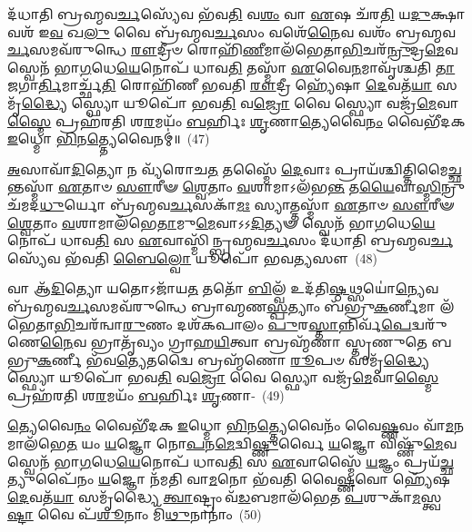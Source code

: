 𑌦᳴𑌧𑌾𑌤𑌿 𑌬𑍍𑌰𑌹𑍍𑌮𑌵\-\ul{𑌰𑍍𑌚}\-𑌸𑍍𑌯𑍇᳴𑌵 𑌭᳴𑌵\-\ul{𑌤𑌿} 𑌵\-\ul{𑌶𑌂} 𑌵𑌾 \ul{𑌏}\-𑌷 𑌚᳴𑌰\-\ul{𑌤𑌿} 𑌯\-\ul{𑌦𑍁}\-𑌕𑍍𑌷𑌾 𑌵𑌶᳴ 𑌇\-\ul{𑌵} 𑌖\-\ul{𑌲𑍁} 𑌵𑍈 𑌬𑍍𑌰᳴𑌹𑍍𑌮𑌵\-\ul{𑌰𑍍𑌚}\-𑌸𑌂 𑌵𑌶𑍇᳴\-\ul{𑌨𑍈}\-𑌵 𑌵𑌶𑌂᳴ 𑌬𑍍𑌰𑌹𑍍𑌮𑌵\-\ul{𑌰𑍍𑌚}\-𑌸𑌮𑌵᳴\-𑌰𑍁𑌨𑍍𑌧𑍇 \ul{𑌰𑍗}\-𑌦𑍍𑌰𑍀𑍞 𑌰𑍋𑌹𑌿᳴\-\ul{𑌣𑍀}\-𑌮𑌾𑌲᳴𑌭𑍇𑌤𑌾\-\ul{𑌭𑌿}\-𑌚𑌰᳴\-\ul{𑌨𑍍𑌰𑍁}\-𑌦𑍍𑌰\-\ul{𑌮𑍇}\-𑌵 𑌸𑍍𑌵𑍇𑌨᳴ 𑌭𑌾\-\ul{𑌗}\-𑌧𑍇\-\ul{𑌯𑍇}\-𑌨𑍋𑌪᳴ 𑌧𑌾𑌵\-\ul{𑌤𑌿} 𑌤𑌸𑍍𑌮𑌾᳴ \ul{𑌏}\-𑌵𑍈\-\ul{𑌨}\-𑌮𑌾𑌵𑍃᳴𑌶𑍍𑌚𑌤𑌿 \ul{𑌤𑌾}\-𑌜𑌗𑌾\-\ul{𑌰𑍍𑌤𑌿}\-𑌮𑌾𑌰𑍍𑌚𑍍𑌛᳴\-\ul{𑌤𑌿} 𑌰𑍋𑌹𑌿᳴𑌣𑍀 𑌭𑌵𑌤𑌿 \ul{𑌰𑍗}\-𑌦𑍍𑌰𑍀 𑌹𑍍𑌯𑍇᳴𑌷𑌾 \ul{𑌦𑍇}\-𑌵𑌤᳴\-\ul{𑌯𑌾} 𑌸𑌮𑍃᳴\-\ul{𑌦𑍍𑌧𑍍𑌯𑍈} 𑌸𑍍𑌫𑍍𑌯𑍋 𑌯𑍂𑌪𑍋᳴ 𑌭𑌵\-\ul{𑌤𑌿} 𑌵\-\ul{𑌜𑍍𑌰𑍋} 𑌵𑍈 𑌸𑍍𑌫𑍍𑌯𑍋 𑌵𑌜𑍍𑌰᳴\-\ul{𑌮𑍇}\-𑌵𑌾\-\ul{𑌸𑍍𑌮𑍈} 𑌪𑍍𑌰𑌹᳴𑌰𑌤𑌿 𑌶\-\ul{𑌰}\-𑌮𑌯𑌂᳴ \ul{𑌬}\-𑌰𑍍\mbox{}𑌹𑌿𑌃 \ul{𑌶𑍃}\-𑌣𑌾\-\ul{𑌤𑍍𑌯𑍇}\-𑌵𑍈\-\ul{𑌨𑌂} 𑌵𑍈𑌭𑍀᳴𑌦𑌕 \ul{𑌇}\-𑌧𑍍𑌮𑍋 \ul{𑌭𑌿}\-𑌨\-\ul{𑌤𑍍𑌤𑍍𑌯𑍇}\-𑌵𑍈𑌨𑌮𑍍॑॥~(47)

{\anuvakamend[{\-\ul{𑌅}\-𑌭𑌿 𑌖\-\ul{𑌲𑍁} 𑌵𑍃\-\ul{𑌷𑍍𑌟𑌿}\-𑌶𑍍𑌛𑌨𑍍𑌦᳴𑌸𑌾\-\ul{𑌮𑍇}\-𑌵 𑌰𑌸𑍇᳴𑌨 \ul{𑌪𑍍𑌰}\-𑌜𑌾𑌮𑌵᳴ 𑌵𑍈𑌶𑍍𑌵\-\ul{𑌦𑍇}\-𑌵𑌾 𑌵𑍈 𑌬𑍍𑌰᳴𑌹𑍍𑌮𑌵\-\ul{𑌰𑍍𑌚}\-𑌸𑌂 𑌯𑍂\-\ul{𑌪} 𑌏\-\ul{𑌕𑌾}\-𑌨𑍍𑌨𑌵𑌿𑍞᳴\-\ul{𑌶}\-𑌤𑌿𑌶𑍍𑌚᳴।~(7)।}]}

\-\ul{𑌅}\-𑌸𑌾𑌵𑌾᳴\-\ul{𑌦𑌿}\-𑌤𑍍𑌯𑍋 𑌨 𑌵𑍍𑌯᳴𑌰𑍋𑌚\-\ul{𑌤} 𑌤𑌸𑍍𑌮𑍈᳴ \ul{𑌦𑍇}\-𑌵𑌾𑌃 𑌪𑍍𑌰𑌾𑌯᳴𑌶𑍍𑌚𑌿𑌤𑍍𑌤𑌿\-𑌮𑍈\-\ul{𑌚𑍍𑌛}\-𑌨𑍍𑌤𑌸𑍍𑌮𑌾᳴ \ul{𑌏}\-𑌤𑌾𑍞 \ul{𑌸𑍗}\-𑌰𑍀𑍟 \ul{𑌶𑍍𑌵𑍇}\-𑌤𑌾𑌂 \ul{𑌵}\-𑌶𑌾𑌮𑌾\-𑌽𑌲᳴𑌭\-\ul{𑌨𑍍𑌤} 𑌤\-\ul{𑌯𑍈}\-𑌵𑌾\-\ul{𑌸𑍍𑌮𑌿}\-𑌨𑍍𑌰𑍁𑌚᳴𑌮𑌦\-\ul{𑌧𑍁}\-𑌰𑍍𑌯𑍋 𑌬𑍍𑌰᳴𑌹𑍍𑌮𑌵\-\ul{𑌰𑍍𑌚}\-𑌸𑌕𑌾᳴\-\ul{𑌮𑌃} 𑌸𑍍𑌯𑌾𑌤𑍍𑌤𑌸𑍍𑌮𑌾᳴ \ul{𑌏}\-𑌤𑌾𑍞 \ul{𑌸𑍗}\-𑌰𑍀𑍟 \ul{𑌶𑍍𑌵𑍇}\-𑌤𑌾𑌂 \ul{𑌵}\-𑌶𑌾𑌮𑌾𑌲᳴𑌭𑍇\-\ul{𑌤𑌾}\-𑌮𑍁\-\ul{𑌮𑍇}\-𑌵𑌾𑌽𑌽\-\ul{𑌦𑌿}\-𑌤𑍍𑌯𑍟 𑌸𑍍𑌵𑍇𑌨᳴ 𑌭𑌾\-\ul{𑌗}\-𑌧𑍇\-\ul{𑌯𑍇}\-𑌨𑍋𑌪᳴ 𑌧𑌾𑌵\-\ul{𑌤𑌿} 𑌸 \ul{𑌏}\-𑌵𑌾𑌸𑍍𑌮𑌿᳴𑌨𑍍𑌬𑍍𑌰𑌹𑍍𑌮𑌵\-\ul{𑌰𑍍𑌚}\-𑌸𑌂 𑌦᳴𑌧𑌾𑌤𑌿 𑌬𑍍𑌰𑌹𑍍𑌮𑌵\-\ul{𑌰𑍍𑌚}\-𑌸𑍍𑌯𑍇᳴𑌵 𑌭᳴𑌵𑌤𑌿 \ul{𑌬𑍈}\-\-\ul{𑌲𑍍}\-\mbox{}𑌵𑍋 𑌯𑍂𑌪𑍋᳴ 𑌭𑌵\-\ul{𑌤𑍍𑌯}\-𑌸𑍗~(48)

𑌵𑌾 𑌆᳴\-\ul{𑌦𑌿}\-𑌤𑍍𑌯𑍋 𑌯𑌤𑍋\-𑌽𑌜𑌾᳴𑌯\-\ul{𑌤} 𑌤𑌤𑍋᳴ \ul{𑌬𑌿}\-𑌲𑍍𑌵᳴ 𑌉𑌦᳴𑌤𑌿\-\ul{𑌷𑍍𑌠}\-𑌥𑍍𑌸𑌯𑍋॑\-\ul{𑌨𑍍𑌯𑍇}\-𑌵 𑌬𑍍𑌰᳴𑌹𑍍𑌮𑌵\-\ul{𑌰𑍍𑌚}\-𑌸𑌮𑌵᳴\-𑌰𑍁𑌨𑍍𑌧𑍇 𑌬𑍍𑌰𑌾𑌹𑍍𑌮𑌣\-\ul{𑌸𑍍𑌪}\-𑌤𑍍𑌯𑌾𑌂 𑌬᳴𑌭𑍍𑌰𑍁\-\ul{𑌕}\-𑌰𑍍𑌣𑍀𑌮𑌾 𑌲᳴𑌭𑍇𑌤𑌾\-\ul{𑌭𑌿}\-\-𑌚𑌰᳴𑌨𑍍𑌵𑌾\-\ul{𑌰𑍁}\-𑌣𑌂 𑌦𑌶᳴\-𑌕𑌪𑌾𑌲𑌂 \ul{𑌪𑍁}\-𑌰\-\ul{𑌸𑍍𑌤𑌾}\-𑌨𑍍𑌨𑌿𑌰𑍍𑌵᳴\-\ul{𑌪𑍇}\-𑌦𑍍𑌵𑌰𑍁᳴𑌣𑍇\-\ul{𑌨𑍈}\-𑌵 𑌭𑍍𑌰𑌾𑌤𑍃᳴𑌵𑍍𑌯𑌂 𑌗𑍍𑌰𑌾𑌹\-\ul{𑌯𑌿}\-𑌤𑍍𑌵𑌾 𑌬𑍍𑌰𑌹𑍍𑌮᳴𑌣𑌾 𑌸𑍍𑌤𑍃𑌣𑍁𑌤𑍇 𑌬𑌭𑍍𑌰𑍁\-\ul{𑌕}\-𑌰𑍍𑌣𑍀 𑌭᳴𑌵\-\ul{𑌤𑍍𑌯𑍇}\-𑌤𑌦𑍍𑌵𑍈 𑌬𑍍𑌰𑌹𑍍𑌮᳴𑌣𑍋 \ul{𑌰𑍂}\-𑌪𑍞 𑌸𑌮𑍃᳴\-\ul{𑌦𑍍𑌧𑍍𑌯𑍈} 𑌸𑍍𑌫𑍍𑌯𑍋 𑌯𑍂𑌪𑍋᳴ 𑌭𑌵\-\ul{𑌤𑌿} 𑌵\-\ul{𑌜𑍍𑌰𑍋} 𑌵𑍈 𑌸𑍍𑌫𑍍𑌯𑍋 𑌵𑌜𑍍𑌰᳴\-\ul{𑌮𑍇}\-𑌵𑌾\-\ul{𑌸𑍍𑌮𑍈} 𑌪𑍍𑌰𑌹᳴𑌰𑌤𑌿 𑌶\-\ul{𑌰}\-𑌮𑌯𑌂᳴ \ul{𑌬}\-𑌰𑍍\mbox{}𑌹𑌿𑌃 \ul{𑌶𑍃}\-𑌣𑌾-~(49)

\-\ul{𑌤𑍍𑌯𑍇}\-𑌵𑍈\-\ul{𑌨𑌂} 𑌵𑍈𑌭𑍀᳴𑌦𑌕 \ul{𑌇}\-𑌧𑍍𑌮𑍋 \ul{𑌭𑌿}\-𑌨\-\ul{𑌤𑍍𑌤𑍍𑌯𑍇}\-𑌵𑍈𑌨𑌂᳴ 𑌵𑍈\-\ul{𑌷𑍍𑌣}\-𑌵𑌂 𑌵𑌾᳴\-\ul{𑌮}\-𑌨𑌮𑌾\-𑌲᳴𑌭𑍇\-\ul{𑌤} 𑌯𑌂 \ul{𑌯}\-𑌜𑍍𑌞𑍋 𑌨𑍋\-\ul{𑌪}\-𑌨\-\ul{𑌮𑍇}\-𑌦𑍍𑌵𑌿\-\ul{𑌷𑍍𑌣𑍁}\-𑌰𑍍𑌵𑍈 \ul{𑌯}\-𑌜𑍍𑌞𑍋 𑌵𑌿𑌷𑍍𑌣𑍁᳴\-\ul{𑌮𑍇}\-𑌵 𑌸𑍍𑌵𑍇𑌨᳴ 𑌭𑌾\-\ul{𑌗}\-𑌧𑍇\-\ul{𑌯𑍇}\-𑌨𑍋𑌪᳴ 𑌧𑌾𑌵\-\ul{𑌤𑌿} 𑌸 \ul{𑌏}\-𑌵𑌾𑌸𑍍𑌮𑍈᳴ \ul{𑌯}\-𑌜𑍍𑌞𑌂 𑌪𑍍𑌰𑌯᳴\-\ul{𑌚𑍍𑌛}\-𑌤𑍍𑌯𑍁𑌪𑍈᳴𑌨𑌂 \ul{𑌯}\-𑌜𑍍𑌞𑍋 𑌨᳴𑌮𑌤𑌿 𑌵𑌾\-\ul{𑌮}\-𑌨𑍋 𑌭᳴𑌵𑌤𑌿 𑌵𑍈\-\ul{𑌷𑍍𑌣}\-𑌵𑍋 𑌹𑍍𑌯𑍇᳴𑌷 \ul{𑌦𑍇}\-𑌵𑌤᳴\-\ul{𑌯𑌾} 𑌸𑌮𑍃᳴𑌦𑍍𑌧𑍍𑌯𑍈 \ul{𑌤𑍍𑌵𑌾}\-𑌷𑍍𑌟𑍍𑌰𑌂 𑌵᳴\-\ul{𑌡}\-𑌬𑌮𑌾𑌲᳴𑌭𑍇𑌤 \ul{𑌪}\-𑌶𑍁𑌕𑌾᳴\-\ul{𑌮}\-𑌸𑍍𑌤𑍍𑌵\-\ul{𑌷𑍍𑌟𑌾} 𑌵𑍈 𑌪᳴\-\ul{𑌶𑍂}\-𑌨𑌾𑌂 𑌮𑌿᳴\-\ul{𑌥𑍁}\-𑌨𑌾𑌨𑌾𑌂॑~(50)

